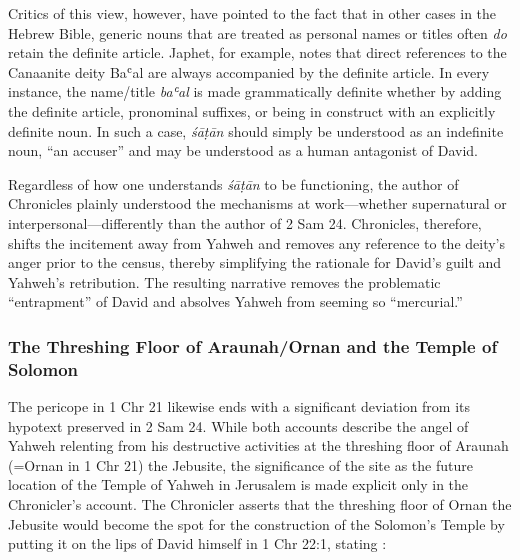 Critics of this view, however, have pointed to the fact that in other
cases in the Hebrew Bible, generic nouns that are treated as personal
names or titles often \emph{do} retain the definite
article.\autocites[114--117]{japhet2009}[370--390]{japhet1993} Japhet,
for example, notes that direct references to the Canaanite deity Baʿal
are always accompanied by the definite article. In every instance, the
name/title \emph{baʿal} is made grammatically definite whether by adding
the definite article, pronominal suffixes, or being in construct with an
explicitly definite noun.\autocites[115]{japhet2009}[citing][§126d]{gkc}
In such a case, \emph{śāṭān} should simply be understood as an
indefinite noun, ``an accuser'' and may be understood as a human
antagonist of
David.\autocites{stokes_jbl2009}[114--117]{japhet2009}[370--390]{japhet1993}

Regardless of how one understands \emph{śāṭān} to be functioning, the
author of Chronicles plainly understood the mechanisms at work---whether
supernatural or interpersonal---differently than the author of 2 Sam 24.
Chronicles, therefore, shifts the incitement away from Yahweh and
removes any reference to the deity's anger prior to the census, thereby
simplifying the rationale for David's guilt and Yahweh's retribution.
The resulting narrative removes the problematic ``entrapment'' of David
and absolves Yahweh from seeming so ``mercurial.''
\autocite[4]{rollston_keith-stuckenbruck2016}

\hypertarget{the-threshing-floor-of-araunahornan-and-the-temple-of-solomon}{%
\subsubsection{The Threshing Floor of Araunah/Ornan and the Temple of
Solomon}\label{the-threshing-floor-of-araunahornan-and-the-temple-of-solomon}}

The pericope in 1 Chr 21 likewise ends with a significant deviation from
its hypotext preserved in 2 Sam 24. While both accounts describe the
angel of Yahweh relenting from his destructive activities at the
threshing floor of Araunah (=Ornan in 1 Chr 21) the Jebusite, the
significance of the site as the future location of the Temple of Yahweh
in Jerusalem is made explicit only in the Chronicler's account. The
Chronicler asserts that the threshing floor of Ornan the Jebusite would
become the spot for the construction of the Solomon's Temple by putting
it on the lips of David himself in 1 Chr 22:1, stating :

